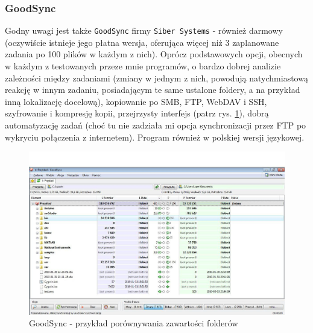 \subsubsection{GoodSync}
Godny uwagi jest także \verb|GoodSync| firmy \verb|Siber Systems| \cite{2} - również darmowy (oczywiście istnieje jego płatna wersja, oferująca więcej niż 3 zaplanowane zadania po 100 plików w każdym z nich). Oprócz podstawowych opcji, obecnych w każdym z testowanych przeze mnie programów, o bardzo dobrej analizie zależności między zadaniami (zmiany w jednym z nich, powodują natychmiastową reakcję w innym zadaniu, posiadającym te same ustalone foldery, a na przykład inną lokalizację docelową), kopiowanie po SMB, FTP, WebDAV i SSH, szyfrowanie i kompresję kopii, przejrzysty interfejs (patrz rys. \ref{goodsync}), dobrą automatyzację zadań (choć tu nie zadziała mi opcja synchronizacji przez FTP po wykryciu połączenia z internetem). Program również w polskiej wersji językowej.
\begin{figure}[h!]
	\centering
	\includegraphics[width=1\textwidth]{img/s2.jpeg}
	\caption{GoodSync - przykład porównywania zawartości folderów}
	\label{goodsync}
\end{figure}

